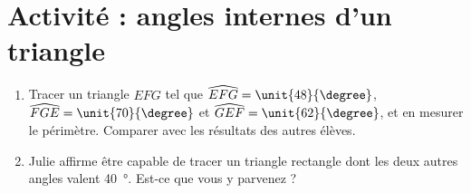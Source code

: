 

\section*{Activité : angles internes d'un triangle}

\begin{enumerate}
    \item
    Tracer un triangle $EFG$ tel que $\widehat{EFG}=\unit{48}{\degree}$, \( \widehat{FGE}=\unit{70}{\degree}\) et \( \widehat{GEF}=\unit{62}{\degree}\), et en mesurer le périmètre. Comparer avec les résultats des autres élèves.
\item
    Julie affirme être capable de tracer un triangle rectangle dont les deux autres angles valent \SI{40}{\degree}.  Est-ce que vous y parvenez ?
\end{enumerate}
